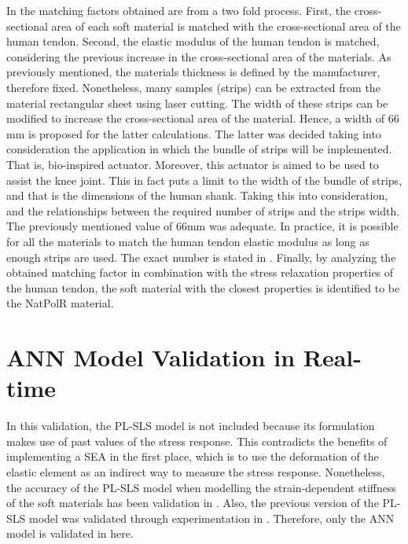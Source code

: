 In  the matching factors obtained are from a two fold process. First, the cross-sectional area of each soft material is matched with the cross-sectional area of the human tendon. Second, the elastic modulus of the human tendon is matched, considering the previous increase in the cross-sectional area of the materials. As previously mentioned, the materials thickness is defined by the manufacturer, therefore fixed. Nonetheless, many samples (strips) can be extracted from the material rectangular sheet using laser cutting. The width of these strips can be modified to increase the cross-sectional area of the material. Hence, a width of 66 mm is proposed for the latter calculations. The latter was decided taking into consideration the application in which the bundle of strips will be implemented. That is, bio-inspired actuator. Moreover, this actuator is aimed to be used to assist the knee joint. This in fact puts a limit to the width of the bundle of strips, and that is the dimensions of the human shank. Taking this into consideration, and the relationships between the required number of strips and the strips width. The previously mentioned value of 66mm was adequate. In practice, it is possible for all the materials to match the human tendon elastic modulus as long as enough strips are used. The exact number is stated in . Finally, by analyzing the obtained matching factor in combination with the stress relaxation properties of the human tendon, the soft material with the closest properties is identified to be the NatPolR material.

\section{ANN Model Validation in Real-time}

In this validation, the PL-SLS model is not included because its formulation makes use of past values of the stress response. This contradicts the benefits of implementing a SEA in the first place, which is to use the deformation of the elastic element as an indirect way to measure the stress response. Nonetheless, the accuracy of the PL-SLS model when modelling the strain-dependent stiffness of the soft materials has been validation in . Also, the previous version of the PL-SLS model was validated through experimentation in \cite{austin2015control}. Therefore, only the ANN model is validated in here. 

